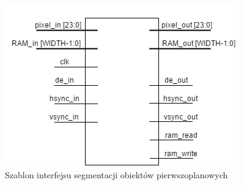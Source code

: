 	\begin{figure}[h!]
			\centering
			\includegraphics[scale=0.75]{img/4/vision_if.png}
			\caption{Szablon interfejsu segmentacji obiektów pierwszoplanowych} %
			\label{fig:fpga_vision_if}
	\end{figure}

